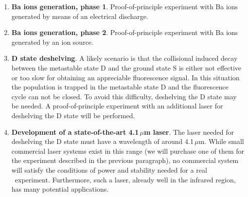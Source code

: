 \begin{enumerate}
	\item \textbf{Ba ions generation, phase 1}. Proof-of-principle experiment with Ba ions generated by means of an electrical discharge.
	
	\item \textbf{Ba ions generation, phase 2}. Proof-of-principle experiment with Ba ions generated by an ion source.	
	
%	
	\item \textbf{D state deshelving}. A likely scenario is that the collisional induced decay between the metastable state D and the ground state S is either not effective or too slow for obtaining an appreciable fluorescence signal. In this situation the population is trapped in the metastable state D and the fluorescence cycle can not be closed. To avoid this difficulty, deshelving the D state may be needed. A proof-of-principle experiment with an additional laser for deshelving the D state will be performed.

\item \textbf{Development of a state-of-the-art 4.1\,$\mu$m laser}. The laser needed for deshelving the D state must have a wavelength of around 4.1\,$\mu$m. While small commercial laser systems exist in this range (we will purchase one of them for the experiment described in the previous paragraph), no commercial system will satisfy the conditions of power and stability needed for a real \BATA\ experiment. Furthermore, such a laser, already well in the infrared region, has many potential applications.

\end{enumerate}

